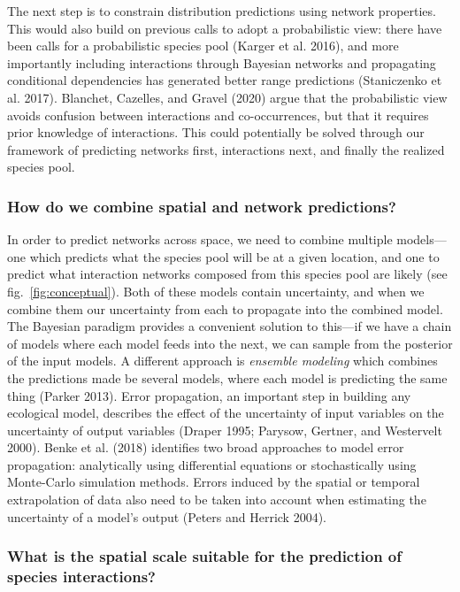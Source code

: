 \documentclass[11pt]{article}
\begin{document}
The next step is to constrain distribution predictions using network
properties. This would also build on previous calls to adopt a
probabilistic view: there have been calls for a probabilistic species
pool (Karger et al. 2016), and more importantly including interactions
through Bayesian networks and propagating conditional dependencies has
generated better range predictions (Staniczenko et al. 2017). Blanchet,
Cazelles, and Gravel (2020) argue that the probabilistic view avoids
confusion between interactions and co-occurrences, but that it requires
prior knowledge of interactions. This could potentially be solved
through our framework of predicting networks first, interactions next,
and finally the realized species pool.

\hypertarget{how-do-we-combine-spatial-and-network-predictions}{%
\subsubsection{How do we combine spatial and network
predictions?}\label{how-do-we-combine-spatial-and-network-predictions}}

In order to predict networks across space, we need to combine multiple
models---one which predicts what the species pool will be at a given
location, and one to predict what interaction networks composed from
this species pool are likely (see fig.~\ref{fig:conceptual}). Both of
these models contain uncertainty, and when we combine them our
uncertainty from each to propagate into the combined model. The Bayesian
paradigm provides a convenient solution to this---if we have a chain of
models where each model feeds into the next, we can sample from the
posterior of the input models. A different approach is \emph{ensemble
modeling} which combines the predictions made be several models, where
each model is predicting the same thing (Parker 2013). Error
propagation, an important step in building any ecological model,
describes the effect of the uncertainty of input variables on the
uncertainty of output variables (Draper 1995; Parysow, Gertner, and
Westervelt 2000). Benke et al. (2018) identifies two broad approaches to
model error propagation: analytically using differential equations or
stochastically using Monte-Carlo simulation methods. Errors induced by
the spatial or temporal extrapolation of data also need to be taken into
account when estimating the uncertainty of a model's output (Peters and
Herrick 2004).

\hypertarget{what-is-the-spatial-scale-suitable-for-the-prediction-of-species-interactions}{%
\subsubsection{What is the spatial scale suitable for the prediction of
species
interactions?}\label{what-is-the-spatial-scale-suitable-for-the-prediction-of-species-interactions}}
\end{document}
